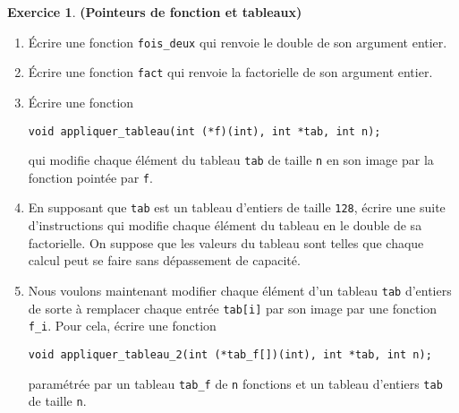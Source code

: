 \documentclass[12pt]{article}
\theoremstyle{definition}
\newtheorem{Exercice}{Exercice}
\begin{document}
\begin{Exercice} {\bf (Pointeurs de fonction et tableaux)}\smallskip
\begin{enumerate}
    \item Écrire une fonction {\tt fois\_deux} qui renvoie le double
    de son argument entier.
    \smallskip

    \item Écrire une fonction {\tt fact} qui renvoie la factorielle
    de son argument entier.
    \smallskip

    \item Écrire une fonction
\begin{lstlisting}
void appliquer_tableau(int (*f)(int), int *tab, int n);
\end{lstlisting}
    qui modifie chaque élément du tableau {\tt tab} de taille {\tt n}
    en son image par la fonction pointée par {\tt f}.
    \smallskip

    \item En supposant que {\tt tab} est un tableau d'entiers de taille
    {\tt 128}, écrire une suite d'instructions qui modifie chaque
    élément du tableau en le double de sa factorielle. On suppose que
    les valeurs du tableau sont telles que chaque calcul peut se faire
    sans dépassement de capacité.
    \smallskip

    \item Nous voulons maintenant modifier chaque élément d'un tableau
    {\tt tab} d'entiers de sorte à remplacer chaque entrée {\tt tab[i]}
    par son image par une fonction {\tt f\_i}. Pour cela, écrire une
    fonction
\begin{lstlisting}
void appliquer_tableau_2(int (*tab_f[])(int), int *tab, int n);
\end{lstlisting}
    paramétrée par un tableau {\tt tab\_f} de {\tt n} fonctions et un
    tableau d'entiers {\tt tab} de taille {\tt n}.
\end{enumerate}
\end{Exercice}
\bigskip
\end{document}
